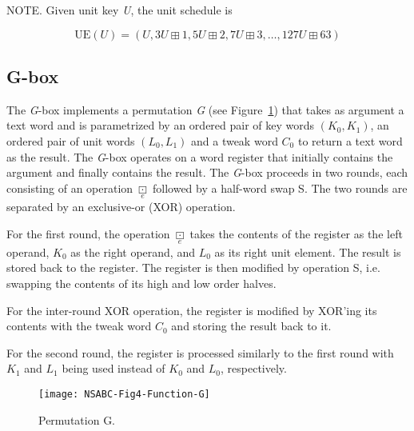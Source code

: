 \documentclass[a4paper,oneside,english]{amsart}
\numberwithin{equation}{section}
\numberwithin{figure}{section}
\begin{document}
NOTE. Given unit key \emph{U}, the unit schedule is

\[
\mathrm{UE}(U)=(U,3U\boxplus1,5U\boxplus2,7U\boxplus3,\ldots,127U\boxplus63)
\]



\subsection{G-box}

The \emph{G}-box implements a permutation \emph{G} (see Figure~\ref{fig:Permutation-G})
that takes as argument a text word and is parametrized by an ordered
pair of key words $(K_{0},K_{1})$, an ordered pair of unit words
$(L_{0},L_{1})$ and a tweak word $C_{0}$ to return a text word as
the result. The \emph{G}-box operates on a word register that initially
contains the argument and finally contains the result. The \emph{G}-box
proceeds in two rounds, each consisting of an operation $\underset{e}{\boxdot}$
followed by a half-word swap S. The two rounds are separated by an
exclusive-or (XOR) operation.

For the first round, the operation $\underset{e}{\boxdot}$ takes
the contents of the register as the left operand, $K_{0}$ as the
right operand, and $L_{0}$ as its right unit element. The result
is stored back to the register. The register is then modified by operation
S, i.e. swapping the contents of its high and low order halves.

For the inter-round XOR operation, the register is modified by XOR'ing
its contents with the tweak word $C_{0}$ and storing the result back
to it.

For the second round, the register is processed similarly to the first
round with $K_{1}$ and $L_{1}$ being used instead of $K_{0}$ and
$L_{0}$, respectively.

\begin{figure}
{\footnotesize \texttt{[image: NSABC-Fig4-Function-G]}}{\footnotesize \par}

\caption{\label{fig:Permutation-G}Permutation G.}
\end{figure}
\end{document}
